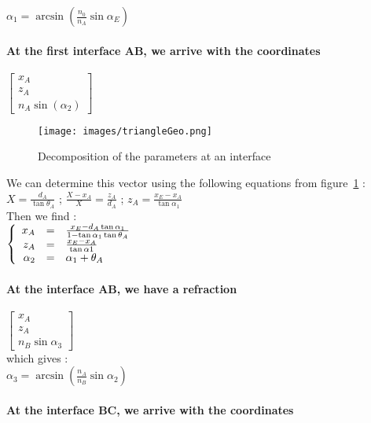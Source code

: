 $\alpha_1 = \arcsin\left(\frac{n_0}{n_A}\sin\alpha_E\right) $

\paragraph*{At the first interface AB, we arrive with the coordinates}

$\begin{bmatrix}x_A \\ z_A \\ n_A\sin\left(\alpha_2\right)\end{bmatrix}$
\begin{figure}[H]
\centering
	\texttt{[image: images/triangleGeo.png]}
	\caption{Decomposition of the parameters at an interface}\label{fig:triangle}
	\centering
\end{figure}
We can determine this vector using the following equations from figure~\ref{fig:triangle} :\\

$X = \frac{d_A}{\tan\theta_A}$ ; $\frac{X-x_A}{X} = \frac{z_A}{d_A}$ ; $z_A = \frac{x_E-x_A}{\tan\alpha_1}$\\

Then we find :\\
$\left \{
   \begin{array}{r c l}
      x_A  & = & \frac{x_E-d_A\tan\alpha_1}{1-\tan\alpha_1\tan\theta_A} \\
      z_A   & = & \frac{x_E-x_A}{\tan\alpha1} \\
      \alpha_2 & = & \alpha_1+\theta_A
   \end{array}
\right.$

\paragraph*{At the interface AB, we have a refraction}
$\begin{bmatrix}x_A \\ z_A \\ n_B\sin\alpha_3\end{bmatrix}$\\

which gives :\\

$\alpha_3 = \arcsin\left(\frac{n_A}{n_B}\sin\alpha_2\right) $

\paragraph*{At the interface BC, we arrive with the coordinates}

